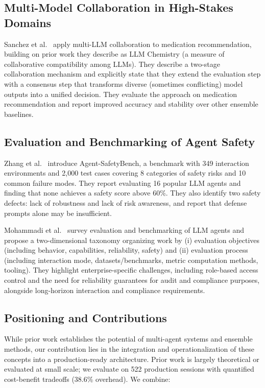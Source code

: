\documentclass[sigconf]{acmart}
\begin{document}
\subsection{Multi-Model Collaboration in High-Stakes Domains}

Sanchez et al.~\cite{Sanchez2025} apply multi-LLM collaboration to medication recommendation, building on prior work they describe as LLM Chemistry (a measure of collaborative compatibility among LLMs). They describe a two-stage collaboration mechanism and explicitly state that they extend the evaluation step with a consensus step that transforms diverse (sometimes conflicting) model outputs into a unified decision. They evaluate the approach on medication recommendation and report improved accuracy and stability over other ensemble baselines.

\subsection{Evaluation and Benchmarking of Agent Safety}

Zhang et al.~\cite{Zhang2024AgentSafetyBench} introduce Agent-SafetyBench, a benchmark with 349 interaction environments and 2,000 test cases covering 8 categories of safety risks and 10 common failure modes. They report evaluating 16 popular LLM agents and finding that none achieves a safety score above 60\%. They also identify two safety defects: lack of robustness and lack of risk awareness, and report that defense prompts alone may be insufficient.

Mohammadi et al.~\cite{Mohammadi2025} survey evaluation and benchmarking of LLM agents and propose a two-dimensional taxonomy organizing work by (i) evaluation objectives (including behavior, capabilities, reliability, safety) and (ii) evaluation process (including interaction mode, datasets/benchmarks, metric computation methods, tooling). They highlight enterprise-specific challenges, including role-based access control and the need for reliability guarantees for audit and compliance purposes, alongside long-horizon interaction and compliance requirements.

\subsection{Positioning and Contributions}

While prior work establishes the potential of multi-agent systems and ensemble methods, our contribution lies in the integration and operationalization of these concepts into a production-ready architecture. Prior work is largely theoretical or evaluated at small scale; we evaluate on 522 production sessions with quantified cost-benefit tradeoffs (38.6\% overhead). We combine:
\end{document}
